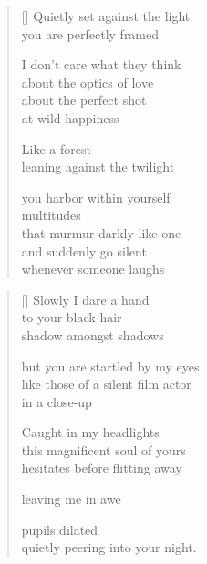 \documentclass[14pt]{extbook}
\newcommand*{\centeredornament}{\centerline{\pgfornament[width=6cm]{88}}}
\begin{document}

\newpage

\vspace*{-15mm}
\centeredornament
\vspace*{-7mm}


\settowidth{\versewidth}{that murmur darkly like one}

\begin{verse}[\versewidth]
  Quietly set against the light \\
  you are perfectly framed

  I don't care what they think \\
  about the optics of love \\
  about the perfect shot \\
  at wild happiness

  Like a forest \\
  leaning against the twilight

  you harbor within yourself \\
  multitudes \\
  that murmur darkly like one \\
  and suddenly go silent \\
  whenever someone laughs
\end{verse}

\newpage

\settowidth{\versewidth}{but you are startled by my eyes}

\begin{verse}[\versewidth]
  Slowly I dare a hand \\
  to your black hair \\
  shadow amongst shadows

  but you are startled by my eyes \\
  like those of a silent film actor \\
  in a close-up

  Caught in my headlights \\
  this magnificent soul of yours \\
  hesitates before flitting away

  leaving me in awe

  pupils dilated \\
  quietly peering into your night.
\end{verse}

\end{document}
